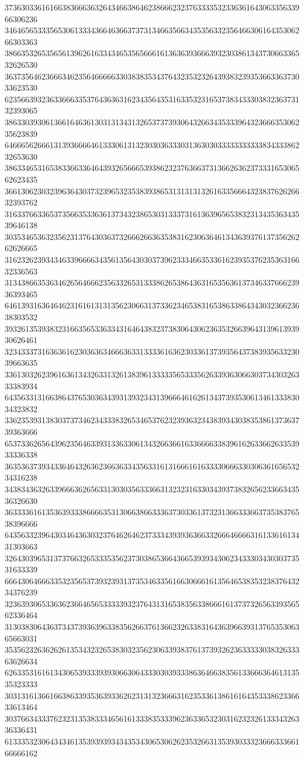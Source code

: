 37363033616166383666363264346638646238666232376333353233636164306335633966306236
34646565333565306133343664636637373134663566343535633235646630616435306266303363
38663532653565613962616334346535656661613636393666393230386134373066336532626530
36373564623666346235646666633038383534376432353232643938323935366336373033623530
62356639323633666335376436363162343564353163353231653738343330383236373132393065
38633039306136616463613031313431326537373930643266343533396432366635306235623839
64666562666131393666646133306131323030363330313630303333333333383433386232653630
38633465316538336633646439326566653938623237636637313662636237333165306562623435
36613062303239636430373239653235383938653131313132616335666432383762626632393762
31633766336537356635336361373432386530313337316136396565383231343536343539646138
30353465363235623137643036373266626636353831623063646134363937613735626262626665
31623262393434633966663435613564303037396233346635336162393537623536316632336563
31343866353634626564666235633265313338626538643631653563613734633766623936393465
64613931636464623161613131356230663137336234653831653863386434303236623638303532
39326135393832316635653363343164643832373830643062363532663964313961393930626461
32343337316363616230363634666363313333616362303361373935643738393563323039663635
33613032623961636134326331326138396133333565333562633936306630373430326333383934
64356331316638643765303634393139323431396664616261343739353061346133383034323832
33623539313830373734623433383265346537623239363234383934303835386137363739363666
65373362656439623564633931336330613432663661633666633839616263366263353933336338
36353637393433646432636236636334356331613166616163333066633030636165653234316238
34383436326339666362656331303035633366313232316330343937383265623366343536326630
36333361613536393338666635313066386633363730336137323136633366373538376538396666
64356332396430346436303237646264623733343939363663326664666631613361613431303663
32643039653137376632653335356237303865366436653939343062343330343030373531633339
66643064666335323565373932393137353463356166306661613564653835323837643234376239
32363930653363623664656533333932376431316538356338666161373732656339356562336464
31303830643637343739363963383562663761366232633831643639663931376535306365663031
35356232636262613534323265383032356230633938376137393262363333303832633363626634
62633531616134306539333939306630643330303933386364663835613366636461313535323333
30313161366166386339353639336262313132366631623533613861616435333862336633613464
30376634333762323135383334656161333835333962363365323031623232613334326336336431
61333532306434346135393939343435343065306262353266313539303332366633366166666162
